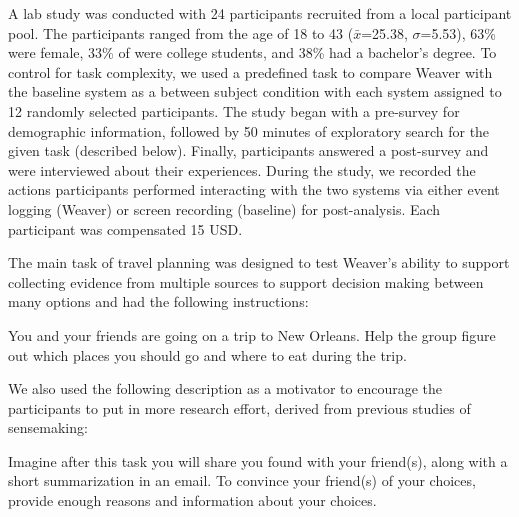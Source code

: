 A lab study was conducted with 24 participants recruited from a local participant pool. The participants ranged from the age of 18 to 43 ($\bar{x}$=25.38, $\sigma$=5.53), 63\% were female, 33\% of were college students, and 38\% had a bachelor's degree. 
To control for task complexity, we used a predefined task to compare Weaver with the baseline system as a between subject condition with each system assigned to 12 randomly selected participants. The study began with a pre-survey for demographic information, followed by 50 minutes of exploratory search for the given task (described below). Finally, participants answered a post-survey and were interviewed about their experiences. During the study, we recorded the actions participants performed interacting with the two systems via either event logging (Weaver) or screen recording (baseline) for post-analysis. Each participant was compensated 15 USD.

The main task of travel planning was designed to test Weaver's ability to support collecting evidence from multiple sources to support decision making between many options and had the following instructions:

    \begin{tightquote}
You and your friends are going on a trip to New Orleans. Help the group figure out which places you should go and where to eat during the trip. 
    \end{tightquote}
    
\noindent We also used the following description as a motivator to encourage the participants to put in more research effort, derived from previous studies of sensemaking:

\begin{tightquote}
Imagine after this task you will share you found with your friend(s), along with a short summarization in an email. To convince your friend(s) of your choices, provide enough reasons and information about your choices.
\end{tightquote}
    


